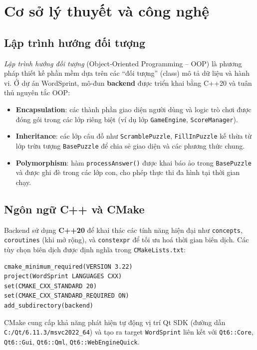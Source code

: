 
\chapter{Cơ sở lý thuyết và công nghệ}
\label{chap:literature_review}

\section{Lập trình hướng đối tượng}
\label{sec:oop}
\textit{Lập trình hướng đối tượng} (Object‑Oriented Programming – OOP) là phương pháp thiết kế phần mềm dựa trên các ``đối tượng'' (class) mô tả dữ liệu và hành vi. Ở dự án WordSprint, mô‑đun \textbf{backend} được triển khai bằng C++20 và tuân thủ nguyên tắc OOP:
\begin{itemize}
    \item \textbf{Encapsulation}: các thành phần giao diện người dùng và logic trò chơi được đóng gói trong các lớp riêng biệt (ví dụ lớp \texttt{GameEngine}, \texttt{ScoreManager}).
    \item \textbf{Inheritance}: các lớp câu đố như \texttt{ScramblePuzzle}, \texttt{FillInPuzzle} kế thừa từ lớp trừu tượng \texttt{BasePuzzle} để chia sẻ giao diện và các phương thức chung.
    \item \textbf{Polymorphism}: hàm \texttt{processAnswer()} được khai báo ảo trong \texttt{BasePuzzle} và được ghi đè trong các lớp con, cho phép thực thi đa hình tại thời gian chạy.
\end{itemize}

\section{Ngôn ngữ C++ và CMake}
\label{sec:cpp_cmake}
Backend sử dụng \textbf{C++20} để khai thác các tính năng hiện đại như \texttt{concepts}, \texttt{coroutines} (khi mở rộng), và \texttt{constexpr} để tối ưu hoá thời gian biên dịch.  Các tùy chọn biên dịch được định nghĩa trong \texttt{CMakeLists.txt}:
\begin{verbatim}
cmake_minimum_required(VERSION 3.22)
project(WordSprint LANGUAGES CXX)
set(CMAKE_CXX_STANDARD 20)
set(CMAKE_CXX_STANDARD_REQUIRED ON)
add_subdirectory(backend)
\end{verbatim}
CMake cung cấp khả năng phát hiện tự động vị trí Qt SDK (đường dẫn \texttt{C:/Qt/6.11.3/msvc2022\_64}) và tạo ra target \texttt{WordSprint} liên kết với \texttt{Qt6::Core}, \texttt{Qt6::Gui}, \texttt{Qt6::Qml}, \texttt{Qt6::WebEngineQuick}.

